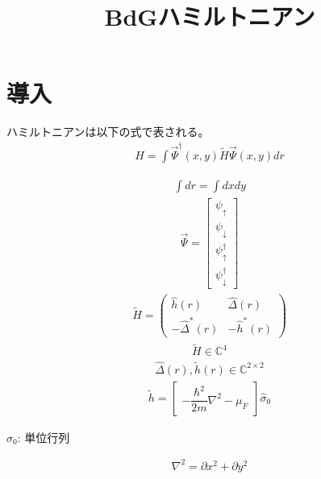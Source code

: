 \documentclass{jarticle}
\begin{document}
\title{BdGハミルトニアン}
\maketitle

\tableofcontents
\newpage
\section{導入}

ハミルトニアンは以下の式で表される。
\begin{align}
  H=\int\vec{\Psi}^\dagger(x,y)\tilde{H}\vec{\Psi}(x,y)dr
\end{align}

\begin{align}
\int{dr}=\int{dxdy}
\end{align}
\begin{align}
\vec{\Psi}=\begin{bmatrix}
\psi_{\uparrow} \\ 
\psi_{\downarrow} \\ 
\psi_{\uparrow}^\dagger \\ 
\psi_{\downarrow}^\dagger
\end{bmatrix} 
\end{align}
\begin{align}
\tilde{H}=
\begin{pmatrix}
	\hat{h}(r) & \hat{\Delta}(r) \\ 
	-\hat{\Delta}^{*}(r) & -\hat{h}^{*}(r)
\end{pmatrix} 
\end{align}
\begin{align}
\tilde{H}\in\mathbb{C}^4
\end{align}
\begin{align}
\hat{\Delta}(r),\tilde{h}(r)\in\mathbb{C}^{2\times 2}
\end{align}
\begin{align}
\tilde{h}=
\begin{bmatrix}
-\dfrac{\hbar^2}{2m}\nabla^2-\mu_F
\end{bmatrix}
\hat{\sigma}_0
\end{align}
\begin{flushright}
$\hat{\sigma}_0$: 単位行列
\end{flushright}
\begin{align}
\nabla^2=\partial x^2+\partial y^2
\end{align}
\end{document}
